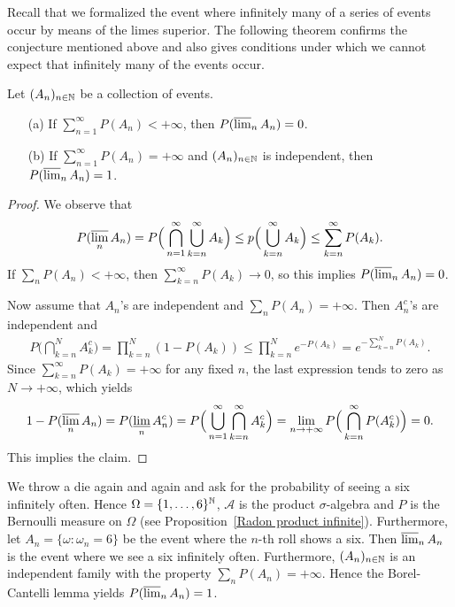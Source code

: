 Recall that we formalized the event where infinitely many of a series of events occur by means of the limes superior. The following theorem confirms the conjecture mentioned above and also gives conditions under which we cannot expect that infinitely many of the events occur.
\begin{theorem}
Let $(A_n)_{n\in\mathbb{N}}$ be a collection of events.
\begin{itemize}
\item[(a)] If $\sum_{n=1}^{\infty}P(A_n)<+\infty$, then $P(\varlimsup_{n}A_n)=0$.
\item[(b)] If $\sum_{n=1}^{\infty}P(A_n)=+\infty$ and $(A_n)_{n\in\mathbb{N}}$ is independent, then $P(\varlimsup_nA_n)=1$.
\end{itemize}
\end{theorem}
\begin{proof}
We observe that
\[P(\varlimsup_nA_n)=P\Big(\bigcap_{n=1}^{\infty}\bigcup_{k=n}^{\infty}A_k\Big)\leq p\Big(\bigcup_{k=n}^{\infty}A_k\Big)\leq\sum_{k=n}^{\infty}P(A_k).\]
If $\sum_nP(A_n)<+\infty$, then $\sum_{k=n}^{\infty}P(A_k)\to 0$, so this implies $P(\varlimsup_nA_n)=0$.\par
Now assume that $A_n$'s are independent and $\sum_nP(A_n)=+\infty$. Then $A_n^c$'s are independent and
\begin{align*}
P\Big(\bigcap_{k=n}^{N}A_k^c\Big)=\prod_{k=n}^{N}(1-P(A_k))\leq\prod_{k=n}^{N}e^{-P(A_k)}=e^{-\sum_{k=n}^{N}P(A_k)}.
\end{align*}
Since $\sum_{k=n}^{\infty}P(A_k)=+\infty$ for any fixed $n$, the last expression tends to zero as $N\to+\infty$, which yields
\[1-P(\varlimsup_nA_n)=P(\varliminf_nA_n^c)=P\Big(\bigcup_{n=1}^{\infty}\bigcap_{k=n}^{\infty}A_k^c\Big)=\lim_{n\to+\infty}P\Big(\bigcap_{k=n}^{\infty}P(A_k^c)\Big)=0.\]
This implies the claim.
\end{proof}
\begin{example}
We throw a die again and again and ask for the probability of seeing a six infinitely often. Hence $\Omega=\{1,\dots,6\}^{\mathbb{N}}$, $\mathcal{A}$ is the product $\sigma$-algebra and $P$ is the Bernoulli measure on $\Omega$ (see Proposition~\ref{Radon product infinite}). Furthermore, let $A_n=\{\omega:\omega_n=6\}$ be the event where the $n$-th roll shows a six. Then $\varlimsup_nA_n$ is the event where we see a six infinitely often. Furthermore, $(A_n)_{n\in\mathbb{N}}$ is an independent family with the property $\sum_nP(A_n)=+\infty$. Hence the Borel-Cantelli lemma yields $P(\varlimsup_nA_n)=1$.
\end{example}
